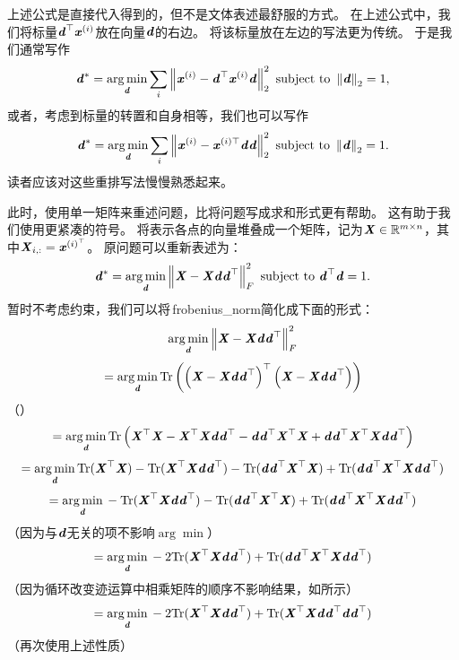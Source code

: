 
上述公式是直接代入得到的，但不是文体表述最舒服的方式。
在上述公式中，我们将标量$\Vd^\top\Vx^{(i)}$放在向量$\Vd$的右边。
将该标量放在左边的写法更为传统。
于是我们通常写作
\begin{equation}
    \Vd^* = \underset{\Vd}{\arg\min} \sum_i \norm{\Vx^{(i)} - \Vd^\top \Vx^{(i)}\Vd}_2^2
        \text{ subject to } \norm{\Vd}_2 = 1,
\end{equation}
或者，考虑到标量的转置和自身相等，我们也可以写作
\begin{equation}
    \Vd^* = \underset{\Vd}{\arg\min} \sum_i \norm{\Vx^{(i)} - \Vx^{(i)\top}\Vd\Vd}_2^2
        \text{ subject to } \norm{\Vd}_2 = 1.
\end{equation}
读者应该对这些重排写法慢慢熟悉起来。


此时，使用单一矩阵来重述问题，比将问题写成求和形式更有帮助。
这有助于我们使用更紧凑的符号。
将表示各点的向量堆叠成一个矩阵，记为$\MX\in\SetR^{m\times n}$，其中$\MX_{i,:}=\Vx^{(i)^\top}$。
原问题可以重新表述为：
\begin{equation}
    \Vd^* = \underset{\Vd}{\arg\min} \norm{\MX - \MX\Vd\Vd^\top}_F^2
        \text{ subject to } \Vd^\top \Vd = 1.
\end{equation}
暂时不考虑约束，我们可以将\,\gls{frobenius_norm}简化成下面的形式：
\begin{equation}
     \underset{\Vd}{\arg\min} \norm{\MX - \MX \Vd\Vd^\top}_F^2
\end{equation}
\begin{equation}
    = \underset{\Vd}{\arg\min} \, \Tr \left( \left( \MX - \MX \Vd\Vd^\top  \right)^\top \left( \MX - \MX \Vd\Vd^\top  \right) \right)
\end{equation}
（）
\begin{equation}
    = \underset{\Vd}{\arg\min} \, \Tr \left( \MX^\top\MX - \MX^\top\MX \Vd\Vd^\top - \Vd\Vd^\top \MX^\top\MX + \Vd\Vd^\top \MX^\top\MX\Vd\Vd^\top  \right)
\end{equation}
\begin{equation}
    = \underset{\Vd}{\arg\min} \, \Tr( \MX^\top\MX)  - \Tr(\MX^\top\MX \Vd\Vd^\top)  - \Tr(\Vd\Vd^\top \MX^\top\MX) + \Tr(\Vd\Vd^\top \MX^\top\MX\Vd\Vd^\top)
\end{equation}
\begin{equation}
    = \underset{\Vd}{\arg\min} \, - \Tr(\MX^\top\MX \Vd\Vd^\top)  - \Tr(\Vd\Vd^\top \MX^\top\MX) + \Tr(\Vd\Vd^\top \MX^\top\MX\Vd\Vd^\top)
\end{equation}
（因为与$\Vd$无关的项不影响$\arg\min$）
\begin{equation}
    = \underset{\Vd}{\arg\min} \, - 2\Tr(\MX^\top\MX \Vd\Vd^\top) + \Tr(\Vd\Vd^\top \MX^\top\MX\Vd\Vd^\top)
\end{equation}
（因为循环改变迹运算中相乘矩阵的顺序不影响结果，如所示）
\begin{equation}
    = \underset{\Vd}{\arg\min} \, - 2\Tr(\MX^\top\MX \Vd\Vd^\top) + \Tr(\MX^\top\MX\Vd\Vd^\top\Vd\Vd^\top )
\end{equation}
（再次使用上述性质）

